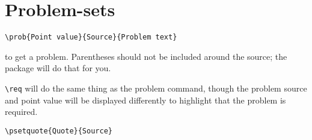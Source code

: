 \documentclass{article}
\begin{document}
\pagebreak\section{Problem-sets}



\vspace{-0.2cm}
\begin{verbatim}
\prob{Point value}{Source}{Problem text}
\end{verbatim}

\noindent to get a problem. Parentheses should not be included around the source; the package will do that for you.
\vspace{0.2cm}


\vspace{-0.2cm}
\verb|\req|
will do the same thing as the problem command, though the problem source and point value will be displayed differently to highlight that the problem is required.
\vspace{0.2cm}

\vspace{-0.2cm}
\begin{verbatim}
\psetquote{Quote}{Source}
\end{verbatim}
\end{document}
